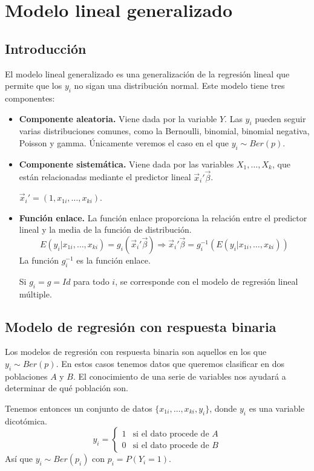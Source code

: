 \chapter{Modelo lineal generalizado}
\section{Introducción}
El modelo lineal generalizado es una generalización de la regresión lineal que permite que los $y_i$ no sigan una distribución normal.
Este modelo tiene tres componentes:
\begin{itemize}
    \item \textbf{Componente aleatoria.}
          Viene dada por la variable $Y$.
          Las $y_i$ pueden seguir varias distribuciones comunes, como la Bernoulli, binomial, binomial negativa, Poisson y gamma.
          Únicamente veremos el caso en el que $y_i \sim Ber(p)$.
    \item \textbf{Componente sistemática.}
          Viene dada por las variables $X_1, \dots, X_k$, que están relacionadas mediante el predictor lineal $\vec{x}_i'\vec{\beta}$.
          \begin{note}
              $\vec{x}_i' = (1, x_{1i}, \dots, x_{ki})$.
          \end{note}
    \item \textbf{Función enlace.}
          La función enlace proporciona la relación entre el predictor lineal y la media de la función de distribución.
          $$E(y_i | x_{1i}, \dots, x_{ki}) = g_i(\vec{x}_i'\vec{\beta}) \Rightarrow \vec{x}_i'\vec{\beta} = g_i^{-1}(E(y_i | x_{1i}, \dots, x_{ki}))$$
          La función $g_i^{-1}$ es la función enlace.
          \begin{remark}
              Si $g_i = g = Id$ para todo $i$, se corresponde con el modelo de regresión lineal múltiple.
          \end{remark}
\end{itemize}

\section{Modelo de regresión con respuesta binaria}
Los modelos de regresión con respuesta binaria son aquellos en los que $y_i \sim Ber(p)$.
En estos casos tenemos datos que queremos clasificar en dos poblaciones $A$ y $B$.
El conocimiento de una serie de variables nos ayudará a determinar de qué población son.

Tenemos entonces un conjunto de datos $\{x_{1i}, \dots, x_{ki}, y_i\}$, donde $y_i$ es una variable dicotómica.
$$y_i = \begin{cases}
        1 & \text{si el dato procede de } A \\
        0 & \text{si el dato procede de } B
    \end{cases}$$
Así que $y_i \sim Ber(p_i)$ con $p_i = P(Y_i = 1)$.

